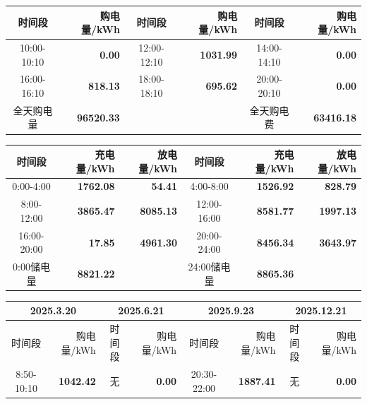 {\begin{center}
\vspace{0.15\baselineskip}
\begin{tabular}{|c|r|c|r|c|r|}
\hline
时间段 & 购电量/kWh & 时间段 & 购电量/kWh & 时间段 & 购电量/kWh \\
\hline10:00-10:10 & \textbf{0.00} & 12:00-12:10 & \textbf{1031.99} & 14:00-14:10 & \textbf{0.00} \\
\hline16:00-16:10 & \textbf{818.13} & 18:00-18:10 & \textbf{695.62} & 20:00-20:10 & \textbf{0.00} \\
\hline
全天购电量 & \textbf{96520.33} & & & 全天购电费 & \textbf{63416.18} \\
\hline
\end{tabular}
\par{}

\vspace{0.15\baselineskip}
\begin{tabular}{|c|r|r|c|r|r|}
\hline
时间段 & 充电量/kWh & 放电量/kWh & 时间段 & 充电量/kWh & 放电量/kWh \\
\hline0:00-4:00 & \textbf{1762.08} & \textbf{54.41} & 4:00-8:00 & \textbf{1526.92} & \textbf{828.79} \\
\hline8:00-12:00 & \textbf{3865.47} & \textbf{8085.13} & 12:00-16:00 & \textbf{8581.77} & \textbf{1997.13} \\
\hline16:00-20:00 & \textbf{17.85} & \textbf{4961.30} & 20:00-24:00 & \textbf{8456.34} & \textbf{3643.97} \\
\hline0:00储电量 & \textbf{8821.22} & & 24:00储电量 & \textbf{8865.36} & \\
\hline
\end{tabular}
\par{}

\vspace{0.15\baselineskip}
\begin{tabular}{|c|r|c|r|c|r|c|r|}
\hline
\multicolumn{2}{c|}{2025.3.20} & \multicolumn{2}{c|}{2025.6.21} & \multicolumn{2}{c|}{2025.9.23} & \multicolumn{2}{c|}{2025.12.21} \\
\hline
时间段 & 购电量/kWh & 时间段 & 购电量/kWh & 时间段 & 购电量/kWh & 时间段 & 购电量/kWh \\
\hline8:50-10:10 & \textbf{1042.42} & 无 & \textbf{0.00} & 20:30-22:00 & \textbf{1887.41} & 无 & \textbf{0.00} \\
\hline
\end{tabular}
\par{}

\end{center}
}
